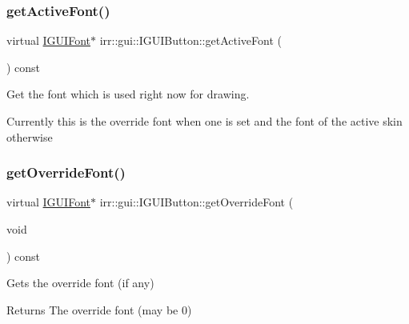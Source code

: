 \subsubsection{\texorpdfstring{get\+Active\+Font()}{getActiveFont()}}
{\footnotesize\ttfamily virtual \hyperlink{classirr_1_1gui_1_1IGUIFont}{I\+G\+U\+I\+Font}$\ast$ irr\+::gui\+::\+I\+G\+U\+I\+Button\+::get\+Active\+Font (\begin{DoxyParamCaption}{ }\end{DoxyParamCaption}) const\hspace{0.3cm}{\ttfamily [pure virtual]}}



Get the font which is used right now for drawing. 

Currently this is the override font when one is set and the font of the active skin otherwise \mbox{\label{classirr_1_1gui_1_1IGUIButton_adbc27c7589bf22d2a7fa676401358578}} 
\subsubsection{\texorpdfstring{get\+Override\+Font()}{getOverrideFont()}}
{\footnotesize\ttfamily virtual \hyperlink{classirr_1_1gui_1_1IGUIFont}{I\+G\+U\+I\+Font}$\ast$ irr\+::gui\+::\+I\+G\+U\+I\+Button\+::get\+Override\+Font (\begin{DoxyParamCaption}\item[{void}]{ }\end{DoxyParamCaption}) const\hspace{0.3cm}{\ttfamily [pure virtual]}}



Gets the override font (if any) 

\begin{DoxyReturn}{Returns}
The override font (may be 0) 
\end{DoxyReturn}
\mbox{\label{classirr_1_1gui_1_1IGUIButton_af233578beb34ba115b0197731e34a3f1}} 
